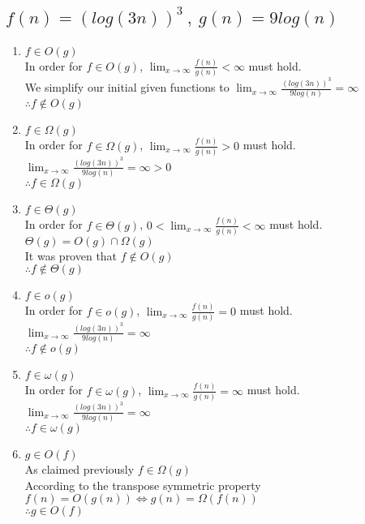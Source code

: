 \documentclass[11pt]{article}
\begin{document}
	\subsection{$f(n)=(log(3n))^3 \ , \ g(n) = 9log(n)$}
		\begin{enumerate}
			\item $f \in O(g)$ \\
				In order for $f \in O(g)$, $\lim_{x \to \infty} \frac{f(n)}{g(n)} < \infty$	must hold. \\
				We simplify our initial given functions to $\lim_{x \to \infty} \frac{(log(3n))^3}{9log(n)} = \infty$ \\
				$\therefore f \notin O(g)$
				
			\item $f \in \Omega(g)$\\
				In order for $f \in \Omega(g)$, $\lim_{x \to \infty} \frac{f(n)}{g(n)} > 0$	must hold. \\
				$\lim_{x \to \infty} \frac{(log(3n))^3}{9log(n)} = \infty > 0$ \\
				$\therefore f \in \Omega(g)$
				
			\item $f \in \Theta(g)$ \\
				In order for $f \in \Theta(g)$, $0 < \lim_{x \to \infty} \frac{f(n)}{g(n)} < \infty$	must hold. \\
				$\Theta(g) = O(g) \cap \Omega(g)$ \\
				It was proven that $f \notin O(g)$\\
				$\therefore f \notin \Theta(g)$
			
			\item $f \in o(g)$ \\
				In order for $f \in o(g)$, $\lim_{x \to \infty} \frac{f(n)}{g(n)} = 0$	must hold. \\
				$\lim_{x \to \infty} \frac{(log(3n))^3}{9log(n)} = \infty $\\
				$\therefore f \notin o(g)$
			
			\item $f \in \omega(g)$ \\
				In order for $f \in \omega(g)$, $\lim_{x \to \infty} \frac{f(n)}{g(n)} = \infty$	must hold. \\
				$\lim_{x \to \infty} \frac{(log(3n))^3}{9log(n)} = \infty$ \\
				$\therefore f \in \omega(g)$
			
			
			\item $g \in O(f)$ \\
				As claimed previously $ f \in \Omega(g)$ \\ 
				According to the transpose symmetric property $f(n) = O(g(n)) \Leftrightarrow g(n) = \Omega (f(n)) $ \\
				$\therefore g \in O(f)$
				

\end{enumerate}
\end{document}
